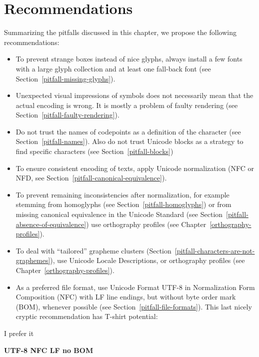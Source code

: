 \section{Recommendations}
\label{recommendations}

Summarizing the pitfalls discussed in this chapter, we propose the following 
recommendations:

\begin{itemize}
   \item To prevent strange boxes instead of nice glyphs, always install a few
         fonts with a large glyph collection and at least one fall-back font
         (see Section~\ref{pitfall-missing-glyphs}).
   \item Unexpected visual impressions of symbols does not necessarily mean that
         the actual encoding is wrong. It is mostly a problem of faulty
         rendering (see Section~\ref{pitfall-faulty-rendering}).
   \item Do not trust the names of codepoints as a definition of the character
         (see Section~\ref{pitfall-names}). Also do not trust Unicode blocks as
         a strategy to find specific characters (see
         Section~\ref{pitfall-blocks})
   \item To ensure consistent encoding of texts, apply Unicode normalization
         (NFC or NFD, see Section~\ref{pitfall-canonical-equivalence}).
   \item To prevent remaining inconsistencies after normalization, for example 
         stemming from homoglyphs (see Section~\ref{pitfall-homoglyphs}) 
         or from missing canonical equivalence in the Unicode Standard
         (see Section~\ref{pitfall-absence-of-equivalence})
         use orthography profiles (see Chapter~\ref{orthography-profiles}).
   \item To deal with ``tailored'' grapheme clusters
         (Section~\ref{pitfall-characters-are-not-graphemes}), use Unicode Locale 
         Descriptions, or orthography profiles 
         (see Chapter~\ref{orthography-profiles}).
   \item As a preferred file format, use Unicode Format UTF-8 in 
         Normalization Form Composition (NFC) with LF line endings, 
         but without byte order mark (BOM), whenever possible (see 
         Section~\ref{pitfall-file-formats}). This last nicely cryptic 
         recommendation has T-shirt potential:
  
\end{itemize}

\begin{center}
  I prefer it
  
  \textbf{UTF-8 NFC LF no BOM}
\end{center}


